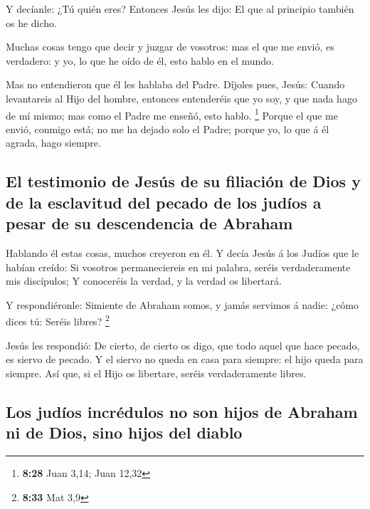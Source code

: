  Y decíanle: ¿Tú quién eres? Entonces Jesús les dijo: El
que al principio también os he dicho.

 Muchas cosas tengo que decir y juzgar de vosotros: mas el
que me envió, es verdadero: y yo, lo que he oído de él, esto hablo en el
mundo.

 Mas no entendieron que él les hablaba del Padre.
 Díjoles pues, Jesús: Cuando levantareis al Hijo del
hombre, entonces entenderéis que yo soy, y que nada hago de mí mismo;
mas como el Padre me enseñó, esto hablo. \footnote{\textbf{8:28} Juan
  3,14; Juan 12,32}  Porque el que me envió, conmigo está;
no me ha dejado solo el Padre; porque yo, lo que á él agrada, hago
siempre.

\hypertarget{el-testimonio-de-jesuxfas-de-su-filiaciuxf3n-de-dios-y-de-la-esclavitud-del-pecado-de-los-juduxedos-a-pesar-de-su-descendencia-de-abraham}{%
\subsection{El testimonio de Jesús de su filiación de Dios y de la
esclavitud del pecado de los judíos a pesar de su descendencia de
Abraham}\label{el-testimonio-de-jesuxfas-de-su-filiaciuxf3n-de-dios-y-de-la-esclavitud-del-pecado-de-los-juduxedos-a-pesar-de-su-descendencia-de-abraham}}

 Hablando él estas cosas, muchos creyeron en él.
 Y decía Jesús á los Judíos que le habían creído: Si
vosotros permaneciereis en mi palabra, seréis verdaderamente mis
discípulos;  Y conoceréis la verdad, y la verdad os
libertará.

 Y respondiéronle: Simiente de Abraham somos, y jamás
servimos á nadie: ¿cómo dices tú: Seréis libres? \footnote{\textbf{8:33}
  Mat 3,9}

 Jesús les respondió: De cierto, de cierto os digo, que
todo aquel que hace pecado, es siervo de pecado.  Y el
siervo no queda en casa para siempre: el hijo queda para siempre.
 Así que, si el Hijo os libertare, seréis verdaderamente
libres.

\hypertarget{los-juduxedos-incruxe9dulos-no-son-hijos-de-abraham-ni-de-dios-sino-hijos-del-diablo}{%
\subsection{Los judíos incrédulos no son hijos de Abraham ni de Dios,
sino hijos del
diablo}\label{los-juduxedos-incruxe9dulos-no-son-hijos-de-abraham-ni-de-dios-sino-hijos-del-diablo}}

